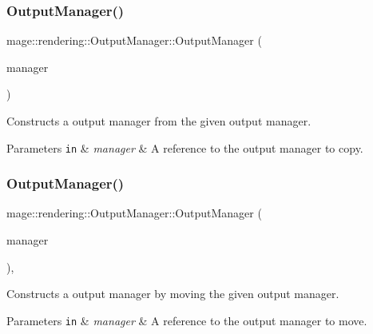 \subsubsection{\texorpdfstring{Output\+Manager()}{OutputManager()}\hspace{0.1cm}{\footnotesize\ttfamily [2/3]}}
{\footnotesize\ttfamily mage\+::rendering\+::\+Output\+Manager\+::\+Output\+Manager (\begin{DoxyParamCaption}\item[{const \mbox{\hyperlink{classmage_1_1rendering_1_1_output_manager}{Output\+Manager}} \&}]{manager }\end{DoxyParamCaption})\hspace{0.3cm}{\ttfamily [delete]}}

Constructs a output manager from the given output manager.


\begin{DoxyParams}[1]{Parameters}
\mbox{\tt in}  & {\em manager} & A reference to the output manager to copy. \\
\hline
\end{DoxyParams}
\mbox{\label{classmage_1_1rendering_1_1_output_manager_aeafc4fb1d7a1904776f738b711635832}} 
\subsubsection{\texorpdfstring{Output\+Manager()}{OutputManager()}\hspace{0.1cm}{\footnotesize\ttfamily [3/3]}}
{\footnotesize\ttfamily mage\+::rendering\+::\+Output\+Manager\+::\+Output\+Manager (\begin{DoxyParamCaption}\item[{\mbox{\hyperlink{classmage_1_1rendering_1_1_output_manager}{Output\+Manager}} \&\&}]{manager }\end{DoxyParamCaption})\hspace{0.3cm}{\ttfamily [default]}, {\ttfamily [noexcept]}}

Constructs a output manager by moving the given output manager.


\begin{DoxyParams}[1]{Parameters}
\mbox{\tt in}  & {\em manager} & A reference to the output manager to move. \\
\hline
\end{DoxyParams}
\mbox{\label{classmage_1_1rendering_1_1_output_manager_ad2a02128a123be93391c8058ef2b3a0b}} 
